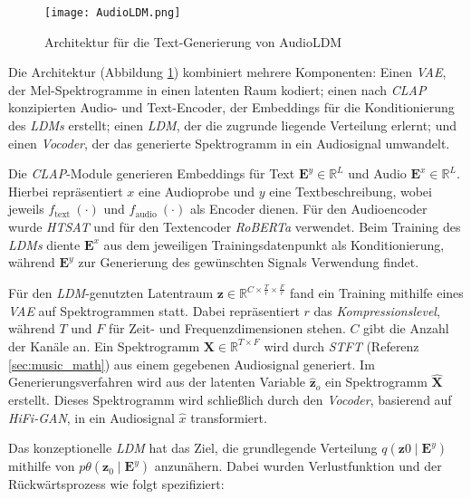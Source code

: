 \documentclass[
  a4paper,  %
  twoside,  %
  bibliography=totoc,
  headsepline,
  cleardoublepage=empty,
  parskip=half,
  draft=false
]{scrbook}
\begin{document}
\begin{figure}[h]
  \centering
  \texttt{[image: AudioLDM.png]}
  \caption[AudioLDM Architektur]{Architektur für die Text-Generierung von AudioLDM\cite{liu_audioldm_2023-1}}
  \label{fig:AudioLDM}
\end{figure} 

Die Architektur (Abbildung \ref{fig:AudioLDM}) kombiniert mehrere Komponenten: Einen \emph{VAE}\cite{kingma_auto-encoding_2022}, der Mel-Spektrogramme in einen latenten Raum kodiert; einen nach \emph{CLAP}\cite{wu_large-scale_2023} konzipierten Audio- und Text-Encoder, der Embeddings für die Konditionierung des \emph{LDMs} erstellt; einen \emph{LDM}, der die zugrunde liegende Verteilung erlernt; und einen \emph{Vocoder}, der das generierte Spektrogramm in ein Audiosignal umwandelt. \cite{liu_audioldm_2023-1}

Die \emph{CLAP}-Module generieren Embeddings für Text $\boldsymbol{E}^y \in \mathbb{R}^L$ und Audio $\boldsymbol{E}^x \in \mathbb{R}^L$. Hierbei repräsentiert $x$ eine Audioprobe und $y$ eine Textbeschreibung, wobei jeweils $f_{\text {text }}(\cdot)$ und $f_{\text {audio }}(\cdot)$ als Encoder dienen. Für den Audioencoder wurde \emph{HTSAT}\cite{chen_hts-at_2022} und für den Textencoder \emph{RoBERTa}\cite{liu_roberta_2019} verwendet. Beim Training des \emph{LDMs} diente $\boldsymbol{E}^x$ aus dem jeweiligen Trainingsdatenpunkt als Konditionierung, während $\boldsymbol{E}^y$ zur Generierung des gewünschten Signals Verwendung findet. \cite{liu_audioldm_2023-1}

Für den \emph{LDM}-genutzten Latentraum $\boldsymbol{z} \in \mathbb{R}^{C \times \frac{T}{r} \times \frac{F}{r}}$ fand ein Training mithilfe eines \emph{VAE} auf Spektrogrammen statt. Dabei repräsentiert $r$ das \emph{Kompressionslevel}, während $T$ und $F$ für Zeit- und Frequenzdimensionen stehen. $C$ gibt die Anzahl der Kanäle an. Ein Spektrogramm $\boldsymbol{X} \in \mathbb{R}^{T \times F}$ wird durch \emph{STFT} (Referenz \ref{sec:music_math}) aus einem gegebenen Audiosignal generiert. Im Generierungsverfahren wird aus der latenten Variable $\hat{\boldsymbol{z}}_o$ ein Spektrogramm $\hat{\boldsymbol{X}}$ erstellt. Dieses Spektrogramm wird schließlich durch den \emph{Vocoder}, basierend auf \emph{HiFi-GAN}\cite{kong_hifi-gan_2020}, in ein Audiosignal $\hat{x}$ transformiert. \cite{liu_audioldm_2023-1}

Das konzeptionelle \emph{LDM} hat das Ziel, die grundlegende Verteilung $q\left(\boldsymbol{z}0 \mid \boldsymbol{E}^y\right)$ mithilfe von $p\theta\left(\boldsymbol{z}_0 \mid \boldsymbol{E}^y\right)$ anzunähern. Dabei wurden Verlustfunktion und der Rückwärtsprozess wie folgt spezifiziert: \cite{liu_audioldm_2023-1}
\end{document}

